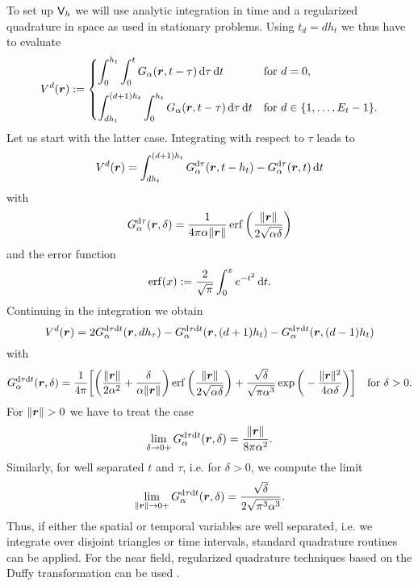 \documentclass[a4paper,11pt]{article}
\begin{document}
To set up ${{\mathsf{V}}}_h$ we will use analytic integration in time and a regularized quadrature in space as used in stationary problems. Using $t_d = dh_t$ we thus have to evaluate
\begin{equation}
\label{eq:V_d}
  V^d({{\bm{r}}}) := 
  \begin{cases}
  \displaystyle
    \int_{0}^{h_t} \int_{0}^{t} G_\alpha({{\bm{r}}},t-\tau) \,{\mathrm{d}}\tau \,{\mathrm{d}} t & \text{for } d = 0, \\[4mm]
  \displaystyle
    \int_{dh_t}^{(d+1)h_t} \int_{0}^{h_t} G_\alpha({{\bm{r}}},t-\tau) \,{\mathrm{d}}\tau \,{\mathrm{d}} t & \text{for } d \in \{1,\ldots,E_t-1\}.
  \end{cases}
\end{equation}
Let us start with the latter case. Integrating with respect to $\tau$ leads to
\begin{equation*}
  V^d({{\bm{r}}}) = \int_{dh_t}^{(d+1)h_t} G^{{\mathrm{d}}\tau}_\alpha({{\bm{r}}},t-h_t) - G^{{\mathrm{d}}\tau}_\alpha({{\bm{r}}},t) \,{\mathrm{d}} t
\end{equation*}
with
\begin{equation}
  \label{eq:G_dtau}
  G^{{\mathrm{d}}\tau}_\alpha({{\bm{r}}},\delta) = \frac{1}{4\pi \alpha \|{{\bm{r}}}\|} \operatorname{erf}\bigg( \frac{\|{{\bm{r}}}\|}{2\sqrt{\alpha\delta}} \bigg)
\end{equation}
and the error function
\begin{equation*}
  \operatorname{erf}(x) := \frac{2}{\sqrt{\pi}} \int_0^x e^{-t^2} \,{\mathrm{d}} t.
\end{equation*}
Continuing in the integration we obtain
\begin{equation*}
  V^d({{\bm{r}}}) = 2G^{{\mathrm{d}}\tau{\mathrm{d}} t}_\alpha({{\bm{r}}},d h_\tau) - G^{{\mathrm{d}}\tau{\mathrm{d}} t}_\alpha({{\bm{r}}},(d+1)h_t) - G^{{\mathrm{d}}\tau{\mathrm{d}} t}_\alpha({{\bm{r}}},(d-1)h_t)
\end{equation*}
with 
\begin{equation*}
  G^{{\mathrm{d}}\tau{\mathrm{d}} t}_\alpha({{\bm{r}}},\delta) = \frac{1}{4\pi} \bigg[ \bigg( \frac{\|{{\bm{r}}}\|}{2\alpha^2} + \frac{\delta}{\alpha \|{{\bm{r}}}\|} \bigg) \operatorname{erf}\bigg( \frac{\|{{\bm{r}}}\|}{2\sqrt{\alpha\delta}} \bigg) + \frac{\sqrt{\delta}}{\sqrt{\pi\alpha^3}}\exp\bigg( -\frac{\|{{\bm{r}}}\|^2}{4\alpha\delta} \bigg) \bigg] \quad\text{for } \delta > 0.
\end{equation*}
For $\|{{\bm{r}}}\| > 0$ we have to treat the case
\begin{equation*}
  \lim_{\delta \to 0+} G^{{\mathrm{d}}\tau{\mathrm{d}} t}_\alpha({{\bm{r}}},\delta) = \frac{\|{{\bm{r}}}\|}{8\pi\alpha^2}.
\end{equation*} 
Similarly, for well separated $t$ and $\tau$, i.e. for $\delta > 0$, we compute the limit
\begin{equation*}
  \lim_{\|{{\bm{r}}}\|\to 0+} G^{{\mathrm{d}}\tau{\mathrm{d}} t}_\alpha({{\bm{r}}},\delta) = \frac{\sqrt{\delta}}{2\sqrt{\pi^3\alpha^3}}.
\end{equation*}
Thus, if either the spatial or temporal variables are well separated, i.e. we integrate over disjoint triangles or time intervals, standard quadrature routines can be applied. For the near field, regularized quadrature techniques based on the Duffy transformation can be used \cite{SauSch2010,ManTau2019}. 
\end{document}
